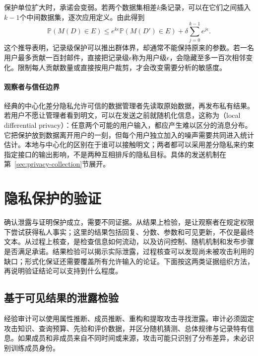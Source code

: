 保护单位扩大时，承诺会变弱。若两个数据集相差$k$条记录，可以在它们之间插入$k-1$个中间数据集，逐次应用定义。由此得到
\begin{equation}
 \mathbb P(M(D)\in E)
 \leq e^{k\epsilon}\mathbb P(M(D')\in E)
   +\delta\sum_{j=0}^{k-1}e^{j\epsilon}.
 \label{eq:privacy-group-bound}
\end{equation}
这个推导表明，记录级保护可以推出群体界，却通常不能保持原来的参数。若一名用户最多贡献一百封邮件，直接把记录级$\epsilon$称为用户级$\epsilon$，会隐藏至多一百次相邻变化。限制每人贡献数量或直接按用户裁剪，才会改变需要分析的敏感度。

\paragraph{观察者与信任边界}

经典的中心化差分隐私允许可信的数据管理者先读取原始数据，再发布私有结果。若用户不愿让管理者看到明文，可以在发送之前就随机化信息，这称为（local differential privacy）：任意两个可能的用户输入，都应产生难以区分的消息分布。它把保护放到数据离开用户的一刻，但每个用户独立加入的噪声需要共同进入统计估计。本地与中心化的区别在于谁可以接触明文；两者都可以采用差分隐私来约束指定接口的输出影响，不是两种互相排斥的隐私目标。具体的发送机制在第~\ref{sec:privacy-collection}节展开。

\section{隐私保护的验证}
\label{sec:privacy-verification}

确认泄露与证明保护成立，需要不同证据。从结果上检验，是让观察者在规定权限下尝试获得私人事实；这里的结果包括回复、分数、参数和可见更新，不仅是最终文本。从过程上核查，是检查信息如何流动，以及访问控制、随机机制和发布步骤是否满足承诺。结果检验可以揭示实际泄露，过程核查可以发现尚未被攻击利用的缺口；形式化保证还需要覆盖所有允许输入的论证。下面按这两类证据组织方法，再说明验证结论可以支持到什么程度。

\subsection{基于可见结果的泄露检验}
\label{sec:privacy-leakage-audit}

经验审计可以使用属性推断、成员推断、重构和提取攻击寻找泄露。审计必须固定攻击知识、查询预算、先验和评价数据，并区分随机猜测、总体规律与记录特有信息。如果成员和非成员来自不同时间或来源，攻击可能只识别了分布差异，未必识别训练成员身份。

